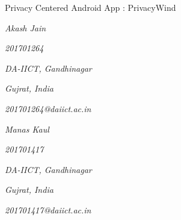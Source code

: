 \documentclass[12pt]{report}
\renewcommand{\_}{\kern-1.5pt\textunderscore\kern-1.5pt}
\begin{document}
\begin{Center}
{\fontsize{23pt}{27.6pt}\selectfont Privacy Centered Android App : PrivacyWind}
\end{Center}

\vspace{\baselineskip}

\vspace{\baselineskip}
\begin{multicols}{2}
\begin{Center}
{\fontsize{14pt}{16.8pt}\selectfont \textit{Akash Jain}}
\end{Center}
\begin{Center}
{\fontsize{14pt}{16.8pt}\selectfont \textit{201701264}}
\end{Center}
\begin{Center}
{\fontsize{14pt}{16.8pt}\selectfont \textit{DA-IICT, Gandhinagar}}
\end{Center}
\begin{Center}
{\fontsize{14pt}{16.8pt}\selectfont \textit{Gujrat, India}}
\end{Center}
\begin{Center}
{\fontsize{14pt}{16.8pt}\selectfont \textit{201701264@daiict.ac.in}}
\end{Center}

\vspace{\baselineskip}
\begin{Center}
{\fontsize{14pt}{16.8pt}\selectfont \textit{Manas Kaul}}
\end{Center}
\begin{Center}
{\fontsize{14pt}{16.8pt}\selectfont \textit{201701417}}
\end{Center}
\begin{Center}
{\fontsize{14pt}{16.8pt}\selectfont \textit{DA-IICT, Gandhinagar}}
\end{Center}
\begin{Center}
{\fontsize{14pt}{16.8pt}\selectfont \textit{Gujrat, India}}
\end{Center}

\end{multicols}
\begin{Center}
{\fontsize{14pt}{16.8pt}\selectfont \textit{201701417@daiict.ac.in}}
\end{Center}
\end{document}
